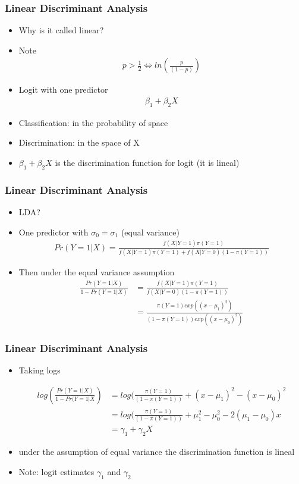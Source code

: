 \documentclass[
  shownotes,
  xcolor={svgnames},
  hyperref={colorlinks,citecolor=DarkBlue,linkcolor=andesred,urlcolor=DarkBlue}
  , aspectratio=169]{beamer}
\begin{document}
\begin{frame}[fragile]
\frametitle{Linear Discriminant Analysis}

\begin{itemize}
  \item Why is it called linear?
  \item Note
  \begin{align}
    p>\frac{1}{2} \iff ln(\frac{p}{(1-p)})
  \end{align}
  \item Logit with one predictor
  \begin{align}
  \beta_1 + \beta_2 X
  \end{align}
  \item Classification: in the probability of space
  \item Discrimination: in the space of X
  \item $\beta_1 +\beta_2 X$ is the discrimination function for logit (it is lineal)
\end{itemize}

\end{frame}
\begin{frame}[fragile]
\frametitle{Linear Discriminant Analysis}
\begin{itemize}
  \item LDA?
  \item One predictor with $\sigma_0 = \sigma_1$ (equal variance)
  \begin{align}
  Pr (Y=1|X)=\frac{f(X|Y=1)\pi(Y=1)}{f(X|Y=1)\pi(Y=1) + f(X|Y=0)(1-\pi(Y=1))}
  \end{align}
  \item Then under the equal variance assumption
  \begin{align}
  \frac{Pr (Y=1|X)}{1-Pr(Y=1|X)} &= \frac{f(X|Y=1)\pi(Y=1)}{f(X|Y=0)(1-\pi(Y=1))} \\
                                &= \frac{\pi(Y=1)exp((x-\mu_1)^2)}{(1-\pi(Y=1))exp((x-\mu_0)^2)} 
  \end{align}
\end{itemize}

\end{frame}
\begin{frame}[fragile]
\frametitle{Linear Discriminant Analysis}
\begin{itemize}
  \item Taking logs

\begin{align}
  log \left( \frac{Pr(Y=1|X)}{1-Pr(Y=1|X}\right)  &= log(\frac{\pi(Y=1)}{(1-\pi(Y=1))}+(x-\mu_1)^2-(x-\mu_0)^2 \\
  &= log(\frac{\pi(Y=1)}{(1-\pi(Y=1))}+\mu^2_1-\mu^2_0-2(\mu_1-\mu_0)x \\
  &= \gamma_1 +\gamma_2 X
  \end{align}  
  \item under the assumption of equal variance the discrimination function is lineal
  \item Note: logit estimates $\gamma_1$ and $\gamma_2$
\end{itemize}
\end{frame}
\end{document}
